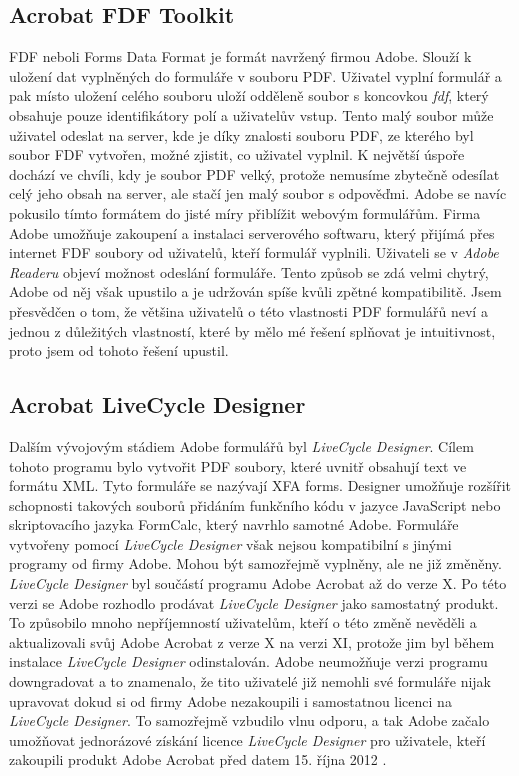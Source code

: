 \documentclass[czech,BP]{thesiskiv}
\begin{document}
\subsection{Acrobat FDF Toolkit}
FDF neboli Forms Data Format je formát navržený firmou Adobe. Slouží k uložení dat vyplněných do formuláře v souboru PDF. Uživatel vyplní formulář a pak místo uložení celého souboru uloží odděleně soubor s koncovkou \emph{fdf}, který obsahuje pouze identifikátory polí a uživatelův vstup. Tento malý soubor může uživatel odeslat na server, kde je díky znalosti souboru PDF, ze kterého byl soubor FDF vytvořen, možné zjistit, co uživatel vyplnil. K největší úspoře dochází ve chvíli, kdy je soubor PDF velký, protože nemusíme zbytečně odesílat celý jeho obsah na server, ale stačí jen malý soubor s odpověďmi. Adobe se navíc pokusilo tímto formátem do jisté míry přiblížit webovým formulářům. Firma Adobe umožňuje zakoupení a instalaci serverového softwaru, který přijímá přes internet FDF soubory od uživatelů, kteří formulář vyplnili. Uživateli se v \emph{Adobe Readeru} objeví možnost odeslání formuláře. Tento způsob se zdá velmi chytrý, Adobe od něj však upustilo a je udržován spíše kvůli zpětné kompatibilitě. Jsem přesvědčen o tom, že většina uživatelů o této vlastnosti PDF formulářů neví a jednou z důležitých vlastností, které by mělo mé řešení splňovat je intuitivnost, proto jsem od tohoto řešení upustil.

\subsection{Acrobat LiveCycle Designer}
Dalším vývojovým stádiem Adobe formulářů byl \emph{LiveCycle Designer}. Cílem tohoto programu bylo vytvořit PDF soubory, které uvnitř obsahují text ve formátu XML. Tyto formuláře se nazývají XFA forms. Designer umožňuje rozšířit schopnosti takových souborů přidáním funkčního kódu v jazyce JavaScript nebo skriptovacího jazyka FormCalc, který navrhlo samotné Adobe. Formuláře vytvořeny pomocí \emph{LiveCycle Designer} však nejsou kompatibilní s jinými programy od firmy Adobe. Mohou být samozřejmě vyplněny, ale ne již změněny. \emph{LiveCycle Designer} byl součástí programu Adobe Acrobat až do verze X. Po této verzi se Adobe rozhodlo prodávat \emph{LiveCycle Designer} jako samostatný produkt. To způsobilo mnoho nepříjemností uživatelům, kteří o této změně nevěděli a aktualizovali svůj Adobe Acrobat z verze X na verzi XI, protože jim byl během instalace \emph{LiveCycle Designer} odinstalován. Adobe neumožňuje verzi programu downgradovat a to znamenalo, že tito uživatelé již nemohli své formuláře nijak upravovat dokud si od firmy Adobe nezakoupili i samostatnou licenci na \emph{LiveCycle Designer}. To samozřejmě vzbudilo vlnu odporu, a tak Adobe začalo umožňovat jednorázové získání licence \emph{LiveCycle Designer} pro uživatele, kteří zakoupili produkt Adobe Acrobat před datem 15. října 2012 \cite{Adobe_LVD}\cite{Adobe_LVD_forum}.
\end{document}
